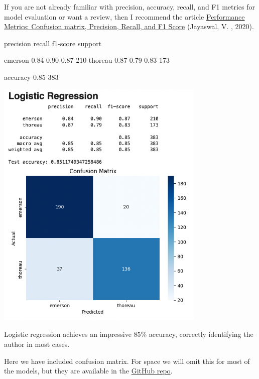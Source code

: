 \documentclass[
]{article}
\newenvironment{Shaded}{}{}
\newcommand{\NormalTok}[1]{#1}
\begin{document}
If you are not already familiar with precision, accuracy, recall, and F1
metrics for model evaluation or want a review, then I recommend the
article
\href{https://towardsdatascience.com/performance-metrics-confusion-matrix-precision-recall-and-f1-score-a8fe076a2262/}{Performance
Metrics: Confusion matrix, Precision, Recall, and F1 Score} (Jayaswal,
V. , 2020).

\begin{Shaded}
\begin{Highlighting}[]
\NormalTok{precision    recall  f1{-}score   support}

\NormalTok{emerson       0.84      0.90      0.87       210}
\NormalTok{thoreau       0.87      0.79      0.83       173}

\NormalTok{accuracy                          0.85       383}
\end{Highlighting}
\end{Shaded}

\includegraphics[width=0.75\textwidth]{logistic_regression_confusion.png}

Logistic regression achieves an impressive 85\% accuracy, correctly
identifying the author in most cases.

Here we have included confusion matrix. For space we will omit this for
most of the models, but they are available in the
\href{https://github.com/ranton256/classifying_concord/tree/main}{GitHub
repo}.
\end{document}
